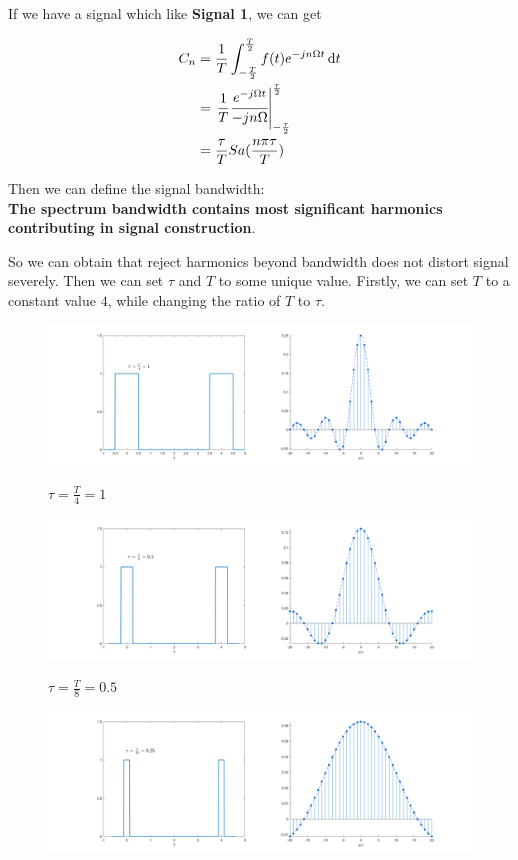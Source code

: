 \documentclass[margin,line]{res}
\newcommand*{\dif}{\mathop{}\!\mathrm{d}}
\begin{document}
\begin{resume}
If we have a signal which like \textbf{Signal 1}, we can get

\begin{align}
C_n &= \frac{1}{T} \int_{-\frac{T}{2}}^{\frac{T}{2}} f(t) e^{-jn \Omega t} \dif t \nonumber \\
	&= \left. \frac{1}{T} \cfrac{ e^{-j \Omega t} }{ -jn\Omega } \right|_{-\frac{\tau}{2}}^{\frac{\tau}{2}} \nonumber \\
	&= \frac{\tau}{T}Sa(\frac{n\pi \tau}{T}) \nonumber 
\end{align}

Then we can define the signal bandwidth: \\
\textbf{The spectrum bandwidth contains most significant harmonics contributing in signal construction}. \par
So we can obtain that reject harmonics beyond bandwidth does not distort signal severely. Then we can set $\tau$ and $T$ to some unique value. Firstly, we can set $T$ to a constant value $4$, while changing the ratio of $T$ to $\tau$.
\begin{figure}[H]
	\centerline{\includegraphics[width=0.9\linewidth]{figure/bw_1.png}}
	\centerline{\textbf{$\tau = \frac{T}{4} = 1$}}
\end{figure}
\begin{figure}[H]
	\centerline{\includegraphics[width=0.9\linewidth]{figure/bw_2.png}}
	\centerline{\textbf{$\tau = \frac{T}{8} = 0.5$}}
\end{figure}
\begin{figure}[H]
	\centerline{\includegraphics[width=0.9\linewidth]{figure/bw_3.png}}

\end{figure}
\end{resume}
\end{document}
